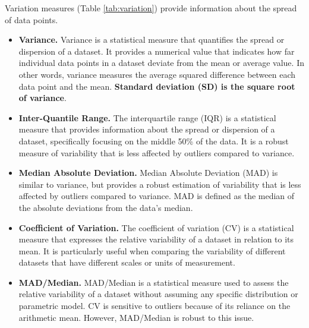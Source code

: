 \documentclass[
]{book}
\begin{document}
Variation measures (Table \ref{tab:variation}) provide information about the spread of data points.

\begin{itemize}
\item
  \textbf{Variance.} Variance is a statistical measure that quantifies the spread or dispersion of a dataset. It provides a numerical value that indicates how far individual data points in a dataset deviate from the mean or average value. In other words, variance measures the average squared difference between each data point and the mean. \textbf{Standard deviation (SD) is the square root of variance}.
\item
  \textbf{Inter-Quantile Range.} The interquartile range (IQR) is a statistical measure that provides information about the spread or dispersion of a dataset, specifically focusing on the middle 50\% of the data. It is a robust measure of variability that is less affected by outliers compared to variance.
\item
  \textbf{Median Absolute Deviation.} Median Absolute Deviation (MAD) is similar to variance, but provides a robust estimation of variability that is less affected by outliers compared to variance. MAD is defined as the median of the absolute deviations from the data's median.
\item
  \textbf{Coefficient of Variation.} The coefficient of variation (CV) is a statistical measure that expresses the relative variability of a dataset in relation to its mean. It is particularly useful when comparing the variability of different datasets that have different scales or units of measurement.
\item
  \textbf{MAD/Median.} MAD/Median is a statistical measure used to assess the relative variability of a dataset without assuming any specific distribution or parametric model. CV is sensitive to outliers because of its reliance on the arithmetic mean. However, MAD/Median is robust to this issue.
\end{itemize}
\end{document}
